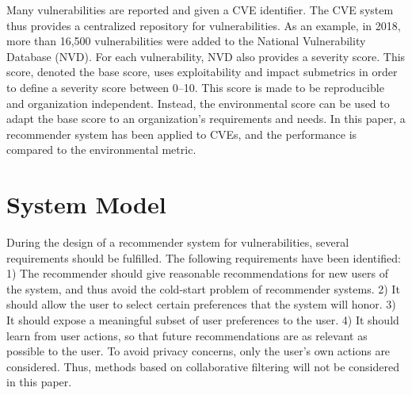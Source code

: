 {Many vulnerabilities are reported and given a CVE identifier. The CVE system thus provides a centralized repository for vulnerabilities. As an example, in 2018, more than 16,500 vulnerabilities were added to the National Vulnerability Database (NVD). For each vulnerability, NVD also provides a severity score. This score, denoted the base score, uses exploitability and impact submetrics in order to define a severity score between 0--10. This score is made to be reproducible and organization independent. Instead, the environmental score can be used to adapt the base score to an organization's requirements and needs. In this paper, a recommender system has been applied to CVEs, and the performance is compared to the environmental metric.    

\section{System Model} \label{sec:model}

During the design of a recommender system for vulnerabilities, several requirements should be fulfilled. The following requirements have been identified: 1) The recommender should give reasonable recommendations for new users of the system, and thus avoid the cold-start problem of recommender systems. 2) It should allow the user to select certain preferences that the system will honor. 3) It should expose a meaningful subset of user preferences to the user. 4) It should learn from user actions, so that future recommendations are as relevant as possible to the user. To avoid privacy concerns, only the user's own actions are considered. Thus, methods based on collaborative filtering will not be considered in this paper.


}
